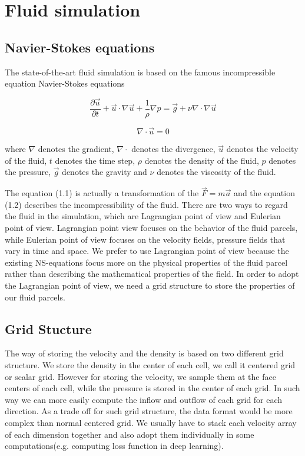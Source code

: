 \documentclass[a4paper,12pt,twoside]{report}
\begin{document}
\section{Fluid simulation}
\subsection{Navier-Stokes equations}
The state-of-the-art fluid simulation is based on the famous incompressible equation Navier-Stokes equations

\begin{equation}
\frac{\partial \vec u}{\partial t}+\vec u\cdot \nabla\vec u+\frac1\rho\nabla p = \vec g + \nu\nabla\cdot\nabla\vec{u}
\end{equation}

\begin{equation}
{\nabla}\cdot\vec{u} = 0
\end{equation}

where $\nabla$ denotes the gradient, $\nabla\cdot$ denotes the divergence, $\vec{u}$ denotes the velocity of the fluid, $t$ denotes the time step, $\rho$ denotes the density of the fluid, $p$ denotes the pressure, $\vec{g}$ denotes the gravity and $\nu$ denotes the viscosity of the fluid.

The equation (1.1) is actually a transformation of the $\vec{F} = m\vec{a}$\cite{fluidnotes} and the equation (1.2) describes the incompressibility of the fluid. There are two ways to regard the fluid in the simulation, which are Lagrangian point of view and Eulerian point of  view. Lagrangian point view focuses on the behavior of the fluid parcels, while Eulerian point of view focuses on the velocity fields, pressure fields that vary in time and space. We prefer to use Lagrangian point of view because the existing NS-equations focus more on the physical properties of the fluid parcel rather than describing the mathematical properties of the field.  In order to adopt the Lagrangian point of view, we need a grid structure to store the properties of our fluid parcels.

\subsection{Grid Stucture}
The way of storing the velocity and the density is based on two different grid structure. We store the density in the center of each cell, we call it centered grid or scalar grid. However for storing the velocity, we sample them at the face centers of each cell\cite{doi:10.1063/1.1761178}, while the pressure is stored in the center of each grid. In such way we can more easily compute the inflow and outflow of each grid for each direction. As a trade off for such grid structure, the data format would be more complex than normal centered grid. We usually have to stack each velocity array of each dimension together and also adopt them individually in some computations(e.g. computing loss function in deep learning).
\end{document}
